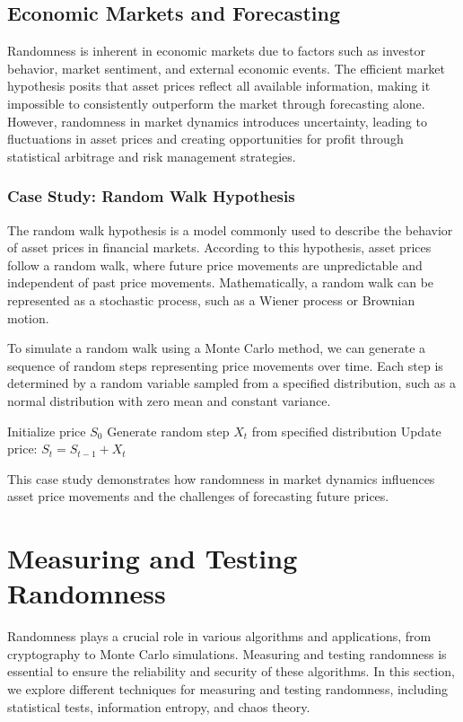 \documentclass[12pt]{book} %
\begin{document}
\subsection{Economic Markets and Forecasting}
Randomness is inherent in economic markets due to factors such as investor behavior, market sentiment, and external economic events. The efficient market hypothesis posits that asset prices reflect all available information, making it impossible to consistently outperform the market through forecasting alone. However, randomness in market dynamics introduces uncertainty, leading to fluctuations in asset prices and creating opportunities for profit through statistical arbitrage and risk management strategies.

\subsubsection{Case Study: Random Walk Hypothesis}
The random walk hypothesis is a model commonly used to describe the behavior of asset prices in financial markets. According to this hypothesis, asset prices follow a random walk, where future price movements are unpredictable and independent of past price movements. Mathematically, a random walk can be represented as a stochastic process, such as a Wiener process or Brownian motion.

To simulate a random walk using a Monte Carlo method, we can generate a sequence of random steps representing price movements over time. Each step is determined by a random variable sampled from a specified distribution, such as a normal distribution with zero mean and constant variance.

\FloatBarrier
\begin{algorithm}[H]
\caption{Random Walk Simulation}
\begin{algorithmic}[1]
\State Initialize price \(S_0\)
    \State Generate random step \(X_t\) from specified distribution
    \State Update price: \(S_t = S_{t-1} + X_t\)
\EndFor
\end{algorithmic}
\end{algorithm}
\FloatBarrier

This case study demonstrates how randomness in market dynamics influences asset price movements and the challenges of forecasting future prices.


\section{Measuring and Testing Randomness}
Randomness plays a crucial role in various algorithms and applications, from cryptography to Monte Carlo simulations. Measuring and testing randomness is essential to ensure the reliability and security of these algorithms. In this section, we explore different techniques for measuring and testing randomness, including statistical tests, information entropy, and chaos theory.
\end{document}
